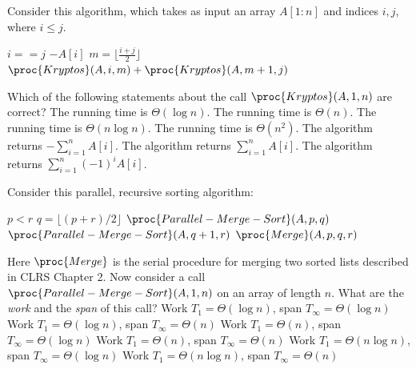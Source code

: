 Consider this algorithm, which takes as input an array $A[1:n]$ and indices $i,j$, where $i\leq j$.
\begin{codebox}
\li \If $i==j$ \Do
\li     \Return $-A[i]$
\End
\li $m=\lfloor\frac{i+j}2\rfloor$
\li \Return $\proc{Kryptos}(A, i, m)+\proc{Kryptos}(A, m+1,j)$
\end{codebox}
Which of the following statements about the call $\proc{Kryptos}(A, 1, n)$ are correct?
\multipleanswers
\optionsstart
\answer The running time is $\Theta(\log n)$.
\answer The running time is $\Theta(n)$.\correct
\answer The running time is $\Theta(n \log n)$.
\answer The running time is $\Theta(n^2)$.
\answer The algorithm returns $-\sum_{i=1}^n A[i]$.\correct
\answer The algorithm returns $\sum_{i=1}^n A[i]$.
\answer The algorithm returns $\sum_{i=1}^n (-1)^i A[i]$.
\optionsend
{}


Consider this parallel, recursive sorting algorithm:
%
\begin{codebox}
  \li \If $p<r$ \Do
  \li $q = \lfloor (p+r)/2\rfloor$
  \li \Spawn $\proc{Parallel-Merge-Sort}(A, p, q)$
  \li \Spawn $\proc{Parallel-Merge-Sort}(A, q+1, r)$
  \li     \Sync
  \li $\proc{Merge}(A, p, q, r)$ \End
\end{codebox}
Here $\proc{Merge}$ is the serial procedure for merging two sorted lists described in CLRS Chapter 2.
Now consider a call $\proc{Parallel-Merge-Sort}(A, 1, n)$ on an array of length $n$.
What are the \emph{work} and the \emph{span} of this call?
\oneanswer
\optionsstart
\answer Work $T_1=\Theta(\log n)$, span $T_\infty=\Theta(\log n)$
\answer Work $T_1=\Theta(\log n)$, span $T_\infty=\Theta(n)$
\answer Work $T_1=\Theta(n)$, span $T_\infty=\Theta(\log n)$
\answer Work $T_1=\Theta(n)$, span $T_\infty=\Theta(n)$
\answer Work $T_1=\Theta(n \log n)$, span $T_\infty=\Theta(\log n)$
\answer Work $T_1=\Theta(n \log n)$, span $T_\infty=\Theta(n)$\correct
\optionsend



